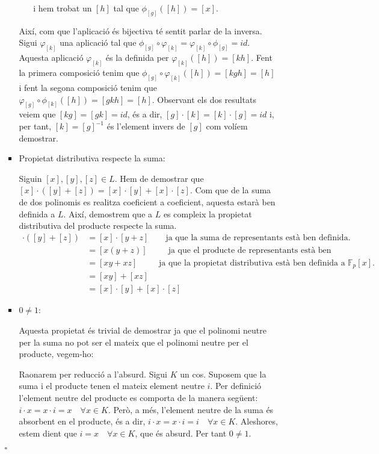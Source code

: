 \documentclass[11pt,a4paper]{article}
\newcommand*{\QED}{\hfill\ensuremath{\square}}
\begin{document}
\begin{enumerate}
\begin{enumerate}
\begin{itemize}
\begin{itemize}
                i hem trobat un $[h]$ tal que $\phi_{[g]}([h])=[x]$.\par
            \end{itemize}
            Així, com que l'aplicació és bijectiva té sentit parlar de la inversa. Sigui $\varphi_{[k]}$ una aplicació tal que $\phi_{[g]}\circ\varphi_{[k]}=\varphi_{[k]}\circ\phi_{[g]}=id$. Aquesta aplicació $\varphi_{[k]}$ és la definida per $\varphi_{[k]}([h])=[kh]$. Fent la primera composició tenim que $\phi_{[g]}\circ\varphi_{[k]}([h])=[kgh]=[h]$ i fent la segona composició tenim que $\varphi_{[g]}\circ\phi_{[k]}([h])=[gkh]=[h]$. Observant els dos resultats veiem que $[kg]=[gk]=id$, és a dir, $[g]\cdot[k]=[k]\cdot[g]=id$ i, per tant, $[k]=[g]^{-1}$ és l'element invers de $[g]$ com volíem demostrar. 
            \item Propietat distributiva respecte la suma:\par
             Siguin $[x],[y],[z]\in L$. Hem de demostrar que $[x]\cdot([y]+[z])=[x]\cdot[y]+[x]\cdot[z]$. Com que de la suma de dos polinomis es realitza coeficient a coeficient, aquesta estarà ben definida a $L$. Així, demostrem que a $L$ es compleix la propietat distributiva del producte respecte la suma.
             \begin{align*}
                 [x]\cdot([y]+[z])&=[x]\cdot[y+z]\qquad \text{ja que la suma de representants està ben definida.}\\
                 &=[x(y+z)]\qquad\;\: \text{ja que el producte de representants està ben definit.}\\
                 &=[xy+xz]\qquad\;\; \text{ja que la propietat distributiva està ben definida a $\mathbb{F}_p[x]$.}\\
                 &=[xy]+[xz]\\
                 &=[x]\cdot[y]+[x]\cdot[z]
             \end{align*}
            \item $0\neq1$:\par
            Aquesta propietat és trivial de demostrar ja que el polinomi neutre per la suma no pot ser el mateix que el polinomi neutre per el producte, vegem-ho:\par
            Raonarem per reducció a l'absurd. Sigui $K$ un cos. Suposem que la suma i el producte tenen el mateix element neutre $i$. Per definició l'element neutre del producte es comporta de la manera següent: $i\cdot x=x\cdot i=x\quad\forall x\in K$. Però, a més, l'element neutre de la suma és absorbent en el producte, és a dir, $i\cdot x=x\cdot i=i\quad\forall x\in K$. Aleshores, estem dient que $i=x\quad\forall x \in K$, que és absurd. Per tant $0\neq 1$.
        \end{itemize}
        \QED
    \end{enumerate}
\end{enumerate}
\end{document}
